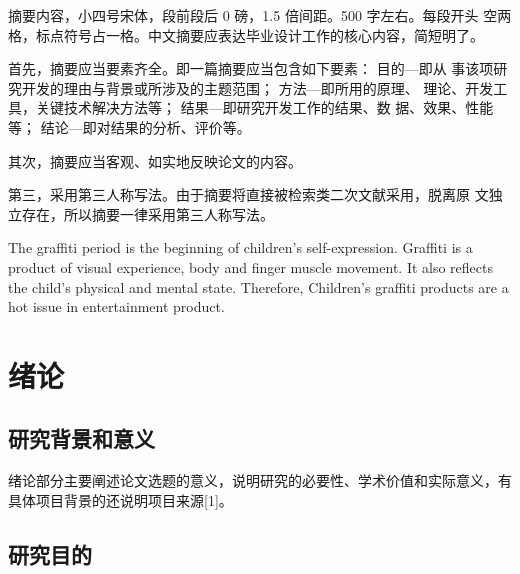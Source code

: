 \documentclass[12pt]{zjutbook}
\begin{document}
\zjutpreface

\begin{abstractcn}
  摘要内容，小四号宋体，段前段后 0 磅，1.5 倍间距。500 字左右。每段开头
  空两格，标点符号占一格。中文摘要应表达毕业设计工作的核心内容，简短明了。

  首先，摘要应当要素齐全。即一篇摘要应当包含如下要素： 目的—即从
  事该项研究开发的理由与背景或所涉及的主题范围； 方法—即所用的原理、
  理论、开发工具，关键技术解决方法等； 结果—即研究开发工作的结果、数
  据、效果、性能等； 结论—即对结果的分析、评价等。

  其次，摘要应当客观、如实地反映论文的内容。

  第三，采用第三人称写法。由于摘要将直接被检索类二次文献采用，脱离原
  文独立存在，所以摘要一律采用第三人称写法。

\end{abstractcn}


\begin{abstracten}
  The graffiti period is the beginning of children's self-expression. Graffiti is a product of visual experience, body and finger muscle movement. It also reflects the child's physical and mental state. Therefore, Children's graffiti products are a hot issue in entertainment product.

\end{abstracten}


\frontmatter
\onehalfspacing
\tableofcontents
\clearpage
\listoffigures
\clearpage
\listoftables


\mainmatter
\doublespacing
\chapter{绪论}
\section{研究背景和意义}
绪论部分主要阐述论文选题的意义，说明研究的必要性、学术价值和实际意义，有具体项目背景的还说明项目来源[1]。
\section{研究目的}
\end{document}

